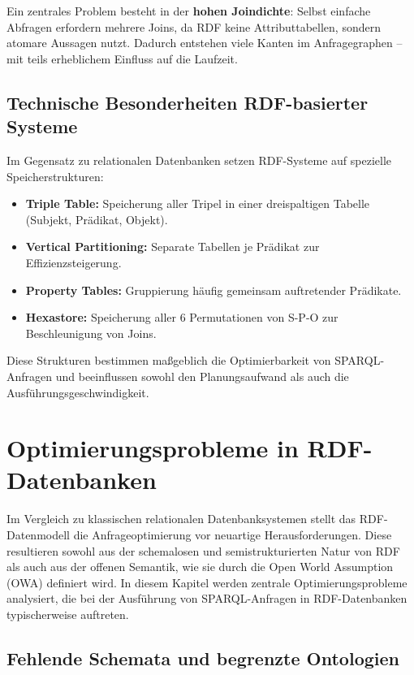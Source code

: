 \documentclass[12pt]{article}
\begin{document}
Ein zentrales Problem besteht in der \textbf{hohen Joindichte}: Selbst einfache Abfragen erfordern mehrere Joins, da RDF keine Attributtabellen, sondern atomare Aussagen nutzt. Dadurch entstehen viele Kanten im Anfragegraphen – mit teils erheblichem Einfluss auf die Laufzeit.

\subsection{Technische Besonderheiten RDF-basierter Systeme}

Im Gegensatz zu relationalen Datenbanken setzen RDF-Systeme auf spezielle Speicherstrukturen:
\begin{itemize}
    \item \textbf{Triple Table:} Speicherung aller Tripel in einer dreispaltigen Tabelle (Subjekt, Prädikat, Objekt).
    \item \textbf{Vertical Partitioning:} Separate Tabellen je Prädikat zur Effizienzsteigerung.
    \item \textbf{Property Tables:} Gruppierung häufig gemeinsam auftretender Prädikate.
    \item \textbf{Hexastore:} Speicherung aller 6 Permutationen von S-P-O zur Beschleunigung von Joins.
\end{itemize}

Diese Strukturen bestimmen maßgeblich die Optimierbarkeit von SPARQL-Anfragen und beeinflussen sowohl den Planungsaufwand als auch die Ausführungsgeschwindigkeit.

\section{Optimierungsprobleme in RDF-Datenbanken} \label{sec:probleme}

Im Vergleich zu klassischen relationalen Datenbanksystemen stellt das RDF-Datenmodell die Anfrageoptimierung vor neuartige Herausforderungen. Diese resultieren sowohl aus der schemalosen und semistrukturierten Natur von RDF als auch aus der offenen Semantik, wie sie durch die Open World Assumption (OWA) definiert wird. In diesem Kapitel werden zentrale Optimierungsprobleme analysiert, die bei der Ausführung von SPARQL-Anfragen in RDF-Datenbanken typischerweise auftreten.

\subsection{Fehlende Schemata und begrenzte Ontologien}
\end{document}
